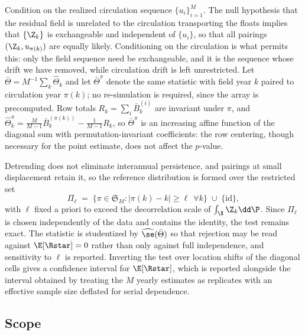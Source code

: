 Condition on the realized circulation sequence $\{u_i\}_{i=1}^M$. The null
hypothesis that the residual field is unrelated to the circulation transporting
the floats implies that $\{\Z_k\}$ is exchangeable and independent of
$\{u_i\}$, so that all pairings $(\Z_k, u_{\pi(k)})$ are equally likely.
Conditioning on the circulation is what permits this: only the field sequence
need be exchangeable, and it is the sequence whose drift we have removed, while
circulation drift is left unrestricted. Let
$\bar\Theta = M^{-1}\sum_k \widehat\Theta_k$ and let $\bar\Theta^\pi$ denote the
same statistic with field year $k$ paired to circulation year $\pi(k)$; no
re-simulation is required, since the array is precomputed. Row totals
$R_k = \sum_i \bar B_k^{(i)}$ are invariant under $\pi$, and
$\widehat\Theta_k^\pi = \tfrac{M}{M-1}\bar B_k^{(\pi(k))} - \tfrac{1}{M-1}R_k$,
so $\bar\Theta^\pi$ is an increasing affine function of the diagonal sum with
permutation-invariant coefficients: the row centering, though necessary for the
point estimate, does not affect the $p$-value.

Detrending does not eliminate interannual persistence, and pairings at small
displacement retain it, so the reference distribution is formed over the
restricted set
\begin{equation}
  \Pi_\ell \;=\; \big\{\pi \in \mathfrak{S}_M : |\pi(k) - k| \ge \ell \ \ \forall k\big\}
  \;\cup\; \{\mathrm{id}\},
\end{equation}
with $\ell$ fixed a priori to exceed the decorrelation scale of
$\int_\X \Z_k \dd\P$. Since $\Pi_\ell$ is chosen independently of the data and
contains the identity, the test remains exact. The statistic is studentized by
$\widehat\se(\bar\Theta)$ so that rejection may be read against
$\E[\Rstar] = 0$ rather than only against full independence, and sensitivity to
$\ell$ is reported. Inverting the test over location shifts of the diagonal
cells gives a confidence interval for $\E[\Rstar]$, which is reported alongside
the interval obtained by treating the $M$ yearly estimates as replicates with an
effective sample size deflated for serial dependence.

\subsection{Scope}

